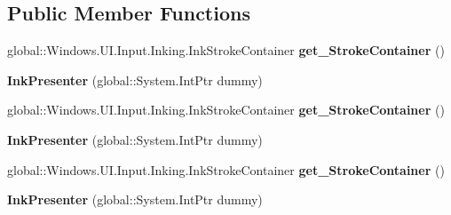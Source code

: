 \subsection*{Public Member Functions}
\begin{DoxyCompactItemize}
\item 
\mbox{\label{class_windows_1_1_u_i_1_1_input_1_1_inking_1_1_ink_presenter_a0b0a4db8e32f2ac6019668c2dbba7165}} 
global\+::\+Windows.\+U\+I.\+Input.\+Inking.\+Ink\+Stroke\+Container {\bfseries get\+\_\+\+Stroke\+Container} ()
\item 
\mbox{\label{class_windows_1_1_u_i_1_1_input_1_1_inking_1_1_ink_presenter_a8f62c1e56a7b0648868048c4cd558bb7}} 
{\bfseries Ink\+Presenter} (global\+::\+System.\+Int\+Ptr dummy)
\item 
\mbox{\label{class_windows_1_1_u_i_1_1_input_1_1_inking_1_1_ink_presenter_a0b0a4db8e32f2ac6019668c2dbba7165}} 
global\+::\+Windows.\+U\+I.\+Input.\+Inking.\+Ink\+Stroke\+Container {\bfseries get\+\_\+\+Stroke\+Container} ()
\item 
\mbox{\label{class_windows_1_1_u_i_1_1_input_1_1_inking_1_1_ink_presenter_a8f62c1e56a7b0648868048c4cd558bb7}} 
{\bfseries Ink\+Presenter} (global\+::\+System.\+Int\+Ptr dummy)
\item 
\mbox{\label{class_windows_1_1_u_i_1_1_input_1_1_inking_1_1_ink_presenter_a0b0a4db8e32f2ac6019668c2dbba7165}} 
global\+::\+Windows.\+U\+I.\+Input.\+Inking.\+Ink\+Stroke\+Container {\bfseries get\+\_\+\+Stroke\+Container} ()
\item 
\mbox{\label{class_windows_1_1_u_i_1_1_input_1_1_inking_1_1_ink_presenter_a8f62c1e56a7b0648868048c4cd558bb7}} 
{\bfseries Ink\+Presenter} (global\+::\+System.\+Int\+Ptr dummy)
\item 
\mbox{\label{class_windows_1_1_u_i_1_1_input_1_1_inking_1_1_ink_presenter_a0b0a4db8e32f2ac6019668c2dbba7165}} 

\end{DoxyCompactItemize}

